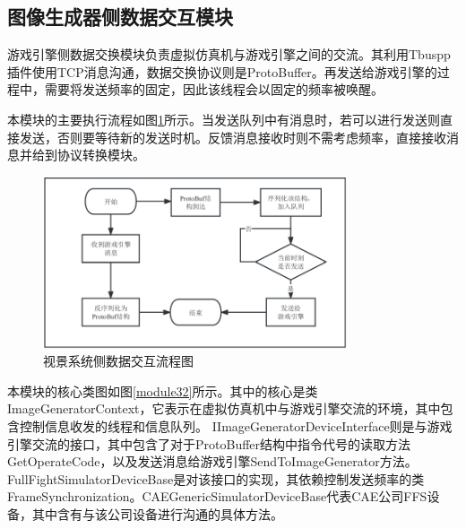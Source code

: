 \subsection{图像生成器侧数据交互模块}
游戏引擎侧数据交换模块负责虚拟仿真机与游戏引擎之间的交流。其利用Tbuspp插件使用TCP消息沟通，数据交换协议则是ProtoBuffer。再发送给游戏引擎的过程中，需要将发送频率的固定，因此该线程会以固定的频率被唤醒。
\par
本模块的主要执行流程如图\ref{module31}所示。当发送队列中有消息时，若可以进行发送则直接发送，否则要等待新的发送时机。反馈消息接收时则不需考虑频率，直接接收消息并给到协议转换模块。
\begin{figure}[h!]
    \begin{center}
        \includegraphics[width=0.8\textwidth]{pictures/flowchart3.pdf}
        \caption{视景系统侧数据交互流程图}
        \label{module31}
    \end{center}
\end{figure}
\par
本模块的核心类图如图\ref{module32}所示。其中的核心是类ImageGeneratorContext，它表示在虚拟仿真机中与游戏引擎交流的环境，其中包含控制信息收发的线程和信息队列。
IImageGeneratorDeviceInterface则是与游戏引擎交流的接口，其中包含了对于ProtoBuffer结构中指令代号的读取方法GetOperateCode，以及发送消息给游戏引擎SendToImageGenerator方法。
FullFightSimulatorDeviceBase是对该接口的实现，其依赖控制发送频率的类FrameSynchronization。CAEGenericSimulatorDeviceBase代表CAE公司FFS设备，其中含有与该公司设备进行沟通的具体方法。
